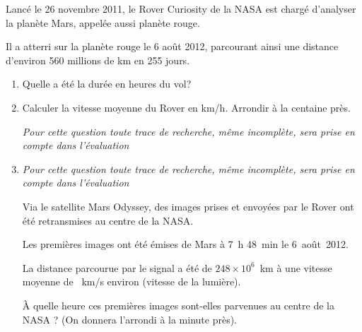 
\medskip

Lancé le 26 novembre 2011, le Rover Curiosity de la NASA est chargé d'analyser la planète Mars, appelée aussi planète rouge.
 
Il a atterri sur la planète rouge le 6 août 2012, parcourant ainsi une distance d'environ 560 millions de km en 255 jours.

\medskip
 
\begin{enumerate}
\item Quelle a été la durée en heures du vol? 
\item Calculer la vitesse moyenne du Rover en km/h. Arrondir à la centaine près.
 
\emph{Pour cette question toute trace de recherche, même incomplète, sera prise en compte dans l'évaluation} 
\item \emph{Pour cette question toute trace de recherche, même incomplète, sera prise en compte dans l'évaluation}

Via le satellite Mars Odyssey, des images prises et envoyées par le Rover ont été retransmises au centre de la NASA.
 
Les premières images ont été émises de Mars à 7~h 48~min le 6~août~2012.
 
La distance parcourue par le signal a été de $248 \times 10^6$~km à une vitesse moyenne de ~km/s environ (vitesse de la lumière).
 
À quelle heure ces premières images sont-elles parvenues au centre de la NASA ? (On donnera l'arrondi à la minute près). 
\end{enumerate}

\medskip

